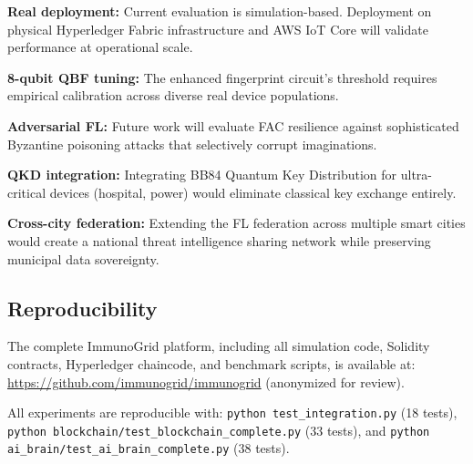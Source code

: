\textbf{Real deployment:} Current evaluation is simulation-based. Deployment
on physical Hyperledger Fabric infrastructure and AWS IoT Core will validate
performance at operational scale.

\textbf{8-qubit QBF tuning:} The enhanced fingerprint circuit's threshold
requires empirical calibration across diverse real device populations.

\textbf{Adversarial FL:} Future work will evaluate FAC resilience against
sophisticated Byzantine poisoning attacks that selectively corrupt imaginations.

\textbf{QKD integration:} Integrating BB84 Quantum Key Distribution for
ultra-critical devices (hospital, power) would eliminate classical key
exchange entirely.

\textbf{Cross-city federation:} Extending the FL federation across multiple
smart cities would create a national threat intelligence sharing network
while preserving municipal data sovereignty.

\subsection{Reproducibility}

The complete ImmunoGrid platform, including all simulation code, Solidity
contracts, Hyperledger chaincode, and benchmark scripts, is available at:
\url{https://github.com/immunogrid/immunogrid} (anonymized for review).

All experiments are reproducible with: \texttt{python test\_integration.py}
(18 tests), \texttt{python blockchain/test\_blockchain\_complete.py} (33 tests),
and \texttt{python ai\_brain/test\_ai\_brain\_complete.py} (38 tests).
